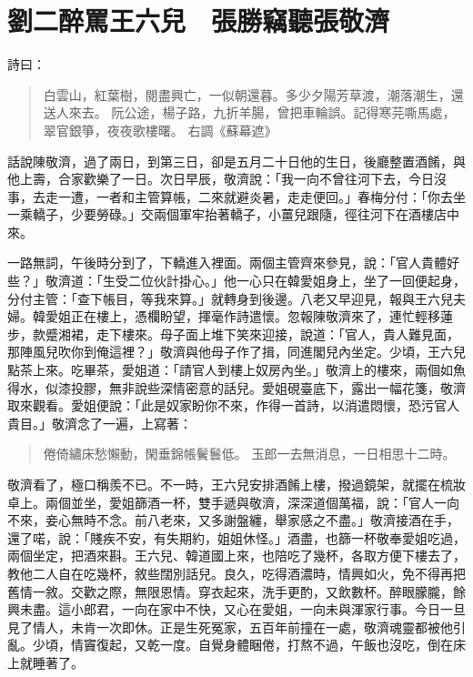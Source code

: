 
\chapter{劉二醉罵王六兒　張勝竊聽張敬濟}

詩曰：
\begin{quote}
白雲山，紅葉樹，閱盡興亡，一似朝還暮。多少夕陽芳草渡，潮落潮生，還送人來去。
阮公途，楊子路，九折羊腸，曾把車輪誤。記得寒芫嘶馬處，翠官銀箏，夜夜歌樓曙。
右調《蘇幕遮》
\end{quote}

話說陳敬濟，過了兩日，到第三日，卻是五月二十日他的生日，後廳整置酒餚，與他上壽，合家歡樂了一日。次日早辰，敬濟說：「我一向不曾往河下去，今日沒事，去走一遭，一者和主管算帳，二來就避炎暑，走走便回。」春梅分付：「你去坐一乘轎子，少要勞碌。」交兩個軍牢抬著轎子，小薑兒跟隨，徑往河下在酒樓店中來。

一路無詞，午後時分到了，下轎進入裡面。兩個主管齊來參見，說：「官人貴體好些？」敬濟道：「生受二位伙計掛心。」他一心只在韓愛姐身上，坐了一回便起身，分付主管：「查下帳目，等我來算。」就轉身到後邊。八老又早迎見，報與王六兒夫婦。韓愛姐正在樓上，憑欄盼望，揮毫作詩遣懷。忽報陳敬濟來了，連忙輕移蓮步，款蹙湘裙，走下樓來。母子面上堆下笑來迎接，說道：「官人，貴人難見面，那陣風兒吹你到俺這裡？」敬濟與他母子作了揖，同進閣兒內坐定。少頃，王六兒點茶上來。吃畢茶，愛姐道：「請官人到樓上奴房內坐。」敬濟上的樓來，兩個如魚得水，似漆投膠，無非說些深情密意的話兒。愛姐硯臺底下，露出一幅花箋，敬濟取來觀看。愛姐便說：「此是奴家盼你不來，作得一首詩，以消遣悶懷，恐污官人貴目。」敬濟念了一遍，上寫著：
\begin{quote}
倦倚繡床愁懶動，閑垂錦帳鬢鬟低。
玉郎一去無消息，一日相思十二時。
\end{quote}

敬濟看了，極口稱羨不已。不一時，王六兒安排酒餚上樓，撥過鏡架，就擺在梳妝卓上。兩個並坐，愛姐篩酒一杯，雙手遞與敬濟，深深道個萬福，說：「官人一向不來，妾心無時不念。前八老來，又多謝盤纏，舉家感之不盡。」敬濟接酒在手，還了喏，說：「賤疾不安，有失期約，姐姐休怪。」酒盡，也篩一杯敬奉愛姐吃過，兩個坐定，把酒來斟。王六兒、韓道國上來，也陪吃了幾杯，各取方便下樓去了，教他二人自在吃幾杯，敘些闊別話兒。良久，吃得酒濃時，情興如火，免不得再把舊情一敘。交歡之際，無限恩情。穿衣起來，洗手更酌，又飲數杯。醉眼朦朧，餘興未盡。這小郎君，一向在家中不快，又心在愛姐，一向未與渾家行事。今日一旦見了情人，未肯一次即休。正是生死冤家，五百年前撞在一處，敬濟魂靈都被他引亂。少頃，情竇復起，又乾一度。自覺身體睏倦，打熬不過，午飯也沒吃，倒在床上就睡著了。

